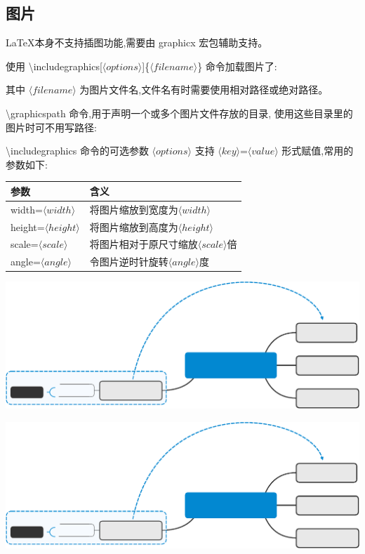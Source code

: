 \documentclass[a4paper]{ctexart}
\begin{document}
    \subsection{图片}
    \LaTeX 本身不支持插图功能,需要由 graphicx 宏包辅助支持。\par
    使用 \textbackslash includegraphics[$\langle options\rangle$]\{$\langle filename\rangle$\} 命令加载图片了:\par
    其中 $\langle filename\rangle$ 为图片文件名,文件名有时需要使用相对路径或绝对路径。\par
    \textbackslash graphicspath 命令,用于声明一个或多个图片文件存放的目录,%
    使用这些目录里的图片时可不用写路径:\par
    \textbackslash includegraphics 命令的可选参数 $\langle options\rangle$ 支持 %
    $\langle key\rangle$=$\langle value\rangle$ 形式赋值,常用的参数如下:\par
    \begin{tabular}{ll}
        \hline
        参数                                 & 含义 \\
        \hline
        width=$\langle width\rangle$        & 将图片缩放到宽度为$\langle width\rangle$ \\
        height=$\langle height\rangle$      & 将图片缩放到高度为$\langle height\rangle$ \\
        scale=$\langle scale\rangle$        & 将图片相对于原尺寸缩放$\langle scale\rangle$倍 \\
        angle=$\langle angle\rangle$        & 令图片逆时针旋转$\langle angle\rangle$度 \\
        \hline
    \end{tabular}
    \includegraphics[scale=0.5]{Central_Topic.eps}
    \graphicspath{{/home/ryan/Documents/RYANFAN113/latex_learning/}}
    \includegraphics[scale=0.5]{Central_Topic.eps}
\end{document}
